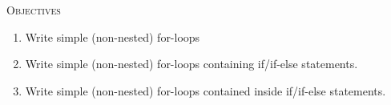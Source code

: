 \textsc{Objectives}
 \begin{enumerate}[nosep]
   \item Write simple (non-nested) for-loops
   \item Write simple (non-nested) for-loops containing if/if-else statements.
   \item Write simple (non-nested) for-loops contained inside if/if-else
         statements.
 \end{enumerate}

